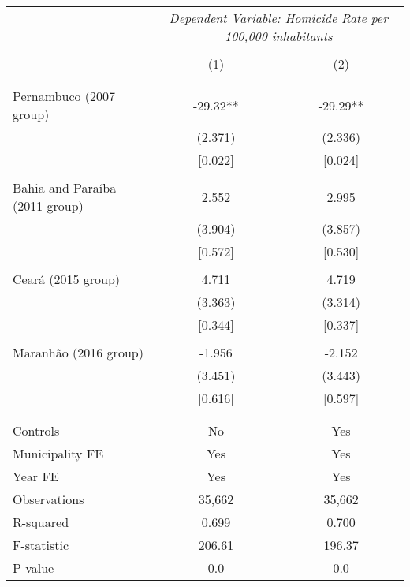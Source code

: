 \documentclass[]{article}
\begin{document}
\begin{table}[htbp]
\centering
\begin{tabular}{lcc} \hline\hline
& \multicolumn{2}{c}{\textit{Dependent Variable: Homicide Rate per 100,000 inhabitants}} \\
\cline{2-3} \\
& (1) & (2) \\ \\ \hline
 &  &  \\
Pernambuco (2007 group) & -29.32** & -29.29** \\
 & (2.371) & (2.336) \\
 & [0.022] & [0.024] \\\\
Bahia and Paraíba (2011 group) & 2.552 & 2.995 \\
 & (3.904) & (3.857) \\
 & [0.572] & [0.530] \\\\
Ceará (2015 group) & 4.711 & 4.719 \\
 & (3.363) & (3.314) \\
 & [0.344] & [0.337] \\\\
Maranhão (2016 group) & -1.956 & -2.152 \\
 & (3.451) & (3.443) \\
 & [0.616] & [0.597] \\\\
 &  &  \\
\hline
Controls & No & Yes \\
Municipality FE & Yes & Yes \\
Year FE & Yes & Yes \\
Observations & 35,662 & 35,662 \\
R-squared & 0.699 & 0.700 \\
F-statistic & 206.61 & 196.37 \\
P-value & 0.0 & 0.0 \\
\hline\hline
\end{tabular}
\end{table}
\end{document}
